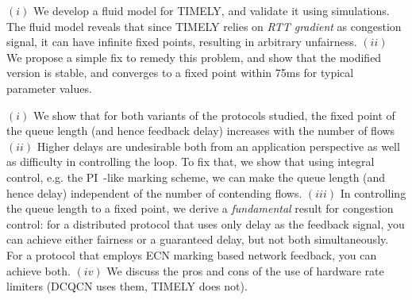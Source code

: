  $(i)$ We develop a fluid model for TIMELY, and validate it using
simulations. The fluid model reveals that since TIMELY relies on {\em RTT
gradient} as congestion signal, it can have infinite fixed points, resulting in
arbitrary unfairness.  $(ii)$ We propose a simple fix to remedy this problem,
and show that the modified version is stable, and converges to a fixed point
within 75ms for typical parameter values.

 $(i)$ We show that for both variants of the protocols
studied, the fixed point of the queue length (and hence feedback delay)
increases with the number of flows $(ii)$ Higher delays are undesirable both
from an application perspective as well as difficulty in controlling the loop.
To fix that, we show that using integral control, e.g. the
PI~\cite{hollot2001designing}-like marking scheme, we can make the queue length
(and hence delay) independent of the number of contending flows. $(iii)$ In
controlling the queue length to a fixed point, we derive a \emph{fundamental}
result for congestion control: for a distributed protocol that uses only delay
as the feedback signal, you can achieve either fairness or a guaranteed delay,
but not both simultaneously. For a protocol that employs ECN marking based
network feedback, you can achieve both. $(iv)$ We discuss the pros and cons of
the use of hardware rate limiters (DCQCN uses them, TIMELY does not).


